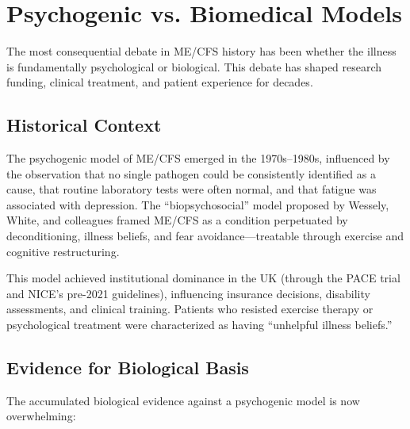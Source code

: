 \section{Psychogenic vs. Biomedical Models}
\label{sec:psychogenic-debate}

The most consequential debate in ME/CFS history has been whether the illness is fundamentally psychological or biological. This debate has shaped research funding, clinical treatment, and patient experience for decades.

\subsection{Historical Context}

The psychogenic model of ME/CFS emerged in the 1970s--1980s, influenced by the observation that no single pathogen could be consistently identified as a cause, that routine laboratory tests were often normal, and that fatigue was associated with depression. The ``biopsychosocial'' model proposed by Wessely, White, and colleagues framed ME/CFS as a condition perpetuated by deconditioning, illness beliefs, and fear avoidance---treatable through exercise and cognitive restructuring.

This model achieved institutional dominance in the UK (through the PACE trial and NICE's pre-2021 guidelines), influencing insurance decisions, disability assessments, and clinical training. Patients who resisted exercise therapy or psychological treatment were characterized as having ``unhelpful illness beliefs.''

\subsection{Evidence for Biological Basis}

The accumulated biological evidence against a psychogenic model is now overwhelming:

